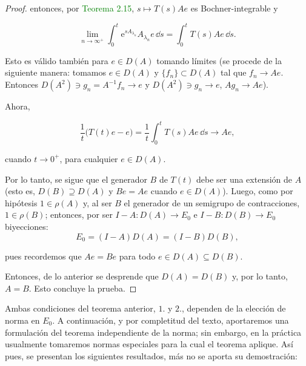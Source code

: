 \begin{proof}
    entonces, por \textcolor{green}{Teorema 2.15}, $s \mapsto T(s)Ae$ es Bochner-integrable y

    \[\lim_{n \rightarrow \infty^+}\int_0^t \mathrm{e}^{sA_{\lambda_n}}A_{\lambda_n}e \, \dd s = \int_0^t T(s)Ae \, \dd s.\]

    Esto es válido también para $e \in D(A)$ tomando límites (se procede de la siguiente manera: tomamos $e \in D(A)$ y $\{f_n\} \subset D(A)$ tal que $f_n \rightarrow Ae$. Entonces $D(A^2) \ni g_n = A^{-1}f_n \rightarrow e$ y $D(A^2) \ni g_n \rightarrow e$, $Ag_n \rightarrow Ae$).

    Ahora,

    \[\frac{1}{t}\big(T(t)e - e\big) = \frac{1}{t}\int_0^t T(s) Ae \, \dd s \rightarrow Ae,\]

    cuando $t \rightarrow 0^+$, para cualquier $e \in D(A)$.

    Por lo tanto, se sigue que el generador $B$ de $T(t)$ debe ser una extensión de $A$ (esto es, $D(B) \supseteq D(A)$ y $Be = Ae$ cuando $e \in D(A)$). Luego, como por hipótesis $1 \in \rho(A)$ y, al ser $B$ el generador de un semigrupo de contracciones\footnotemark, $1 \in \rho(B)$; entonces, por ser $I - A: D(A) \rightarrow E_0$ e $I - B: D(B) \rightarrow E_0$ biyecciones:
    \[E_0 = (I-A)D(A) = (I - B)D(B),\]

    pues recordemos que $Ae = Be$ para todo $e \in D(A) \subseteq D(B)$.

    Entonces, de lo anterior se desprende que $D(A) = D(B)$ y, por lo tanto, $A = B$. Esto concluye la prueba.
\end{proof}

Ambas condiciones del teorema anterior, $1.$ y $2.$, dependen de la elección de norma en $E_0$. A continuación, y por completitud del texto, aportaremos una formulación del teorema independiente de la norma; sin embargo, en la práctica usualmente tomaremos normas especiales para la cual el teorema aplique. Así pues, se presentan los siguientes resultados, más no se aporta su demostración:\\

